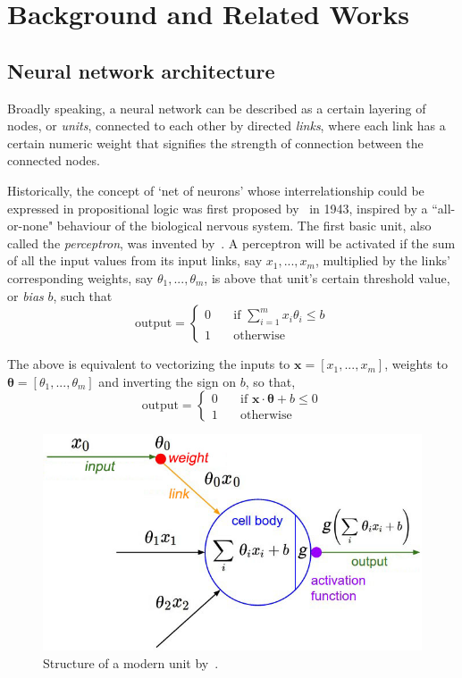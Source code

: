 \chapter{Background and Related Works}\label{ch:background}

\section{Neural network architecture}\label{sec:nn-architecture}

Broadly speaking, a neural network can be described as a certain layering of nodes, or \textit{units}, connected to each other by directed \textit{links}, where each link has a certain numeric weight that signifies the strength of connection between the connected nodes. 

Historically, the concept of `net of neurons' whose interrelationship could be expressed in propositional logic was first proposed by~\cite{McDPit43} in 1943, inspired by a ``all-or-none" behaviour of the biological nervous system. The first basic unit, also called the \textit{perceptron}, was invented by~\cite{Ros62}. A perceptron will be activated if the sum of all the input values from its input links, say $x_1,..., x_m$, multiplied by the links' corresponding weights, say $\theta_1,..., \theta_m$, is above that unit's certain threshold value, or \textit{bias} $b$, such that
\[ \text{output} = 
   \begin{cases}
   0 & \quad \text{if } \displaystyle\sum_{i=1}^{m} x_i \theta_i \leq b\\
   1 & \quad \text{otherwise }
   \end{cases}
\]

The above is equivalent to vectorizing the inputs to $\boldsymbol{x} = [x_1,...,x_m]$, weights to $\boldsymbol{\theta} = [\theta_1,...,\theta_m]$ and inverting the sign on $b$, so that,
\[ \text{output} = 
   \begin{cases}
     0	& \quad \text{if } \boldsymbol{x} \cdot \boldsymbol{\theta} + b \leq 0\\
     1	& \quad \text{otherwise }
   \end{cases}
\]

\begin{figure}
  \centerline{\includegraphics[width=0.7\linewidth]{neuron_model.jpg}}
  \caption{Structure of a modern unit by~\cite{Kar16}.}
  \label{fig:neuron}
\end{figure}

